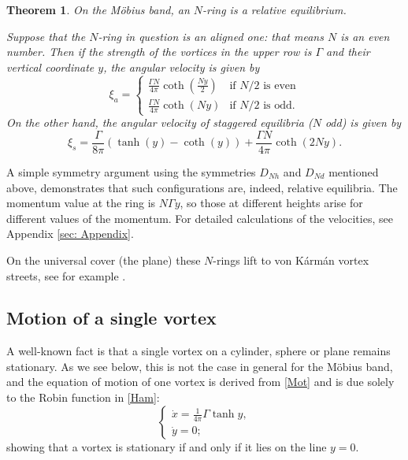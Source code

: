 \documentclass[11pt,twoside]{article}
\newtheorem{theorem}{Theorem}[section]
\theoremstyle{definition}
\numberwithin{equation}{section}
\begin{document}
\begin{theorem} 
\label{st: N ring equilibria}
On the M\"obius band, an $N$-ring is a relative equilibrium. 

Suppose that the $N$-ring in question is an aligned one: that means $N$ is an even number. Then  if the strength of the vortices in the upper row is $\Gamma$ and their vertical coordinate $y$, the angular velocity is given by 
 \begin{equation} \label{eq:xia}
\xi_a =\begin{cases}
  \displaystyle\frac{\Gamma N}{4\pi} \coth\left(\frac{Ny}{2}\right) & \text{if $N/2$ is even} \\[12pt]
 \displaystyle  \frac{\Gamma N}{4\pi}\coth(Ny) & \text{if $N/2$ is odd}. \end{cases}
\end{equation}
On the other hand, the angular velocity of staggered equilibria ($N$ odd) is given  by
\begin{equation}  \label{eq:xis}
\xi_s = \frac{\Gamma}{8\pi}\left(\tanh(y) - \coth(y)\right) + \frac{\Gamma N}{4\pi}\coth\left(2Ny\right). 
\end{equation}
\end{theorem}


A simple symmetry argument using the symmetries $D_{Nh}$ and $D_{Nd}$ mentioned above, demonstrates that such configurations are, indeed, relative equilibria. The momentum value at the ring is $N\Gamma y$, so those at different heights arise for different values of the momentum. For detailed calculations of the velocities, see Appendix \ref{sec: Appendix}.  

On the universal cover (the plane) these $N$-rings lift to von K\'arm\'an vortex streets, see for example \cite{Hally1980}.


\subsection{Motion of a single vortex}
\label{sec: one vortex motion}

    A well-known fact is that a single vortex on a cylinder, sphere or plane remains stationary.  As we see below, this is not the case in general for the M\"obius band, and the equation of motion of one vortex is derived from \eqref{Mot} and is due solely to the Robin function in \eqref{Ham}:
$$ \begin{cases}
 \dot{x} = \frac{1}{4\pi}\Gamma\tanh{y},\\
 \dot{y} = 0;
 \end{cases}$$
 showing that a vortex is stationary if and only if it lies on the line $y=0$. 
 
\end{document}
